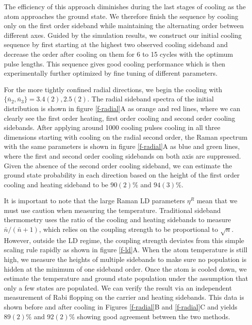 \documentclass[aps,prl,twocolumn,groupedaddress]{revtex4-1}
\begin{document}
The efficiency of this approach diminishes during the last stages of cooling as the atom approaches the ground state.  We therefore finish the sequence by cooling only on the first order sideband while maintaining the alternating order between different axes.
Guided by the simulation results, we construct our initial cooling sequence by first starting
at the highest two observed cooling sideband and decrease the order after cooling on them
for 6 to 15 cycles with the optimum pulse lengths.
This sequence gives good cooling performance which is then experimentally further optimized
by fine tuning of different parameters.

For the more tightly confined radial directions,
we begin the cooling with $\{\bar n_2, \bar n_3\}=3.4(2), 2.5(2)$.
The radial sideband spectra of the initial distribution is shown in figure \ref{f-radial}A
as orange and red lines, where we can clearly see the first order heating,
first order cooling and second order cooling sidebands.
After applying around 1000 cooling pulses cooling in all three dimensions
starting with cooling on the radial second order,
the Raman spectrum with the same parameters is shown in figure \ref{f-radial}A as
blue and green lines, where the first and second order cooling sidebands
on both axis are suppressed.
Given the absence of the second order cooling sideband,
we can estimate the ground state probability in each direction based on the height of
the first order cooling and heating sideband to be $90(2)\%$ and $94(3)\%$.

It is important to note that the large Raman LD parameters $\eta^R$ mean that
we must use caution when measuring the temperature.
Traditional sideband thermometry uses
the ratio of the cooling and heating sidebands to measure $\bar n / (\bar n + 1)$, which relies
on the coupling strength to be proportional to $\sqrt{n}$. However, outside the
LD regime, the coupling strength deviates from this simple scaling rule rapidly as
shown in figure \ref{f-ld}A.
When the atom temperature is still high,
we measure the heights of multiple sidebands to make sure no population is hidden at the
minimum of one sideband order. Once the atom is cooled down, we estimate the temperature
and ground state population under the assumption that only a few states are populated.
We can verify the result via an independent measurement of Rabi flopping on the carrier and heating
sidebands. This data is shown before and after cooling in Figures
\ref{f-radial}B and \ref{f-radial}C and yields $89(2)\%$ and $92(2)\%$
showing good agreement between the two methods.
\end{document}
